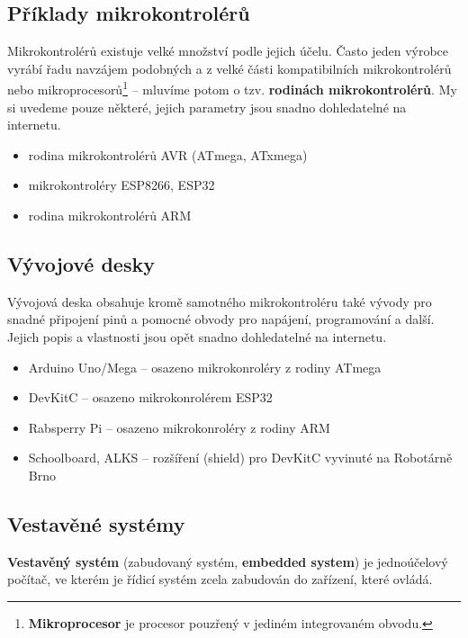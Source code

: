 \documentclass[12pt]{article}
\begin{document}
\subsection{Příklady mikrokontrolérů}

Mikrokontrolérů existuje velké množství podle jejich účelu. 
Často jeden vý\-rob\-ce vyrábí řadu navzájem podobných a z velké části kompatibilních mikrokontrolérů nebo  
mikroprocesorů\footnote{\textbf{Mikroprocesor} je procesor pouzřený v jediném integrovaném obvodu.} -- mluvíme potom o tzv. \textbf{rodinách mikrokontrolérů}.    
My si uvedeme pouze některé, jejich parametry jsou snadno dohledatelné na internetu. 

\begin{itemize}
	\item rodina mikrokontrolérů AVR (ATmega, ATxmega)
	\item  mikrokontroléry ESP8266, ESP32 
	\item rodina  mikrokontrolérů  ARM
\end{itemize}





\subsection{Vývojové desky}

Vývojová deska obsahuje kromě samotného mikrokontroléru také vývody pro snadné připojení pinů a pomocné obvody pro napájení, programování a další. Jejich popis a vlastnosti jsou opět snadno dohledatelné na internetu. 

\begin{itemize}
	\item Arduino Uno/Mega -- osazeno mikrokonroléry z rodiny ATmega
	\item DevKitC  -- osazeno mikrokonrolérem ESP32
	\item Rabsperry Pi  -- osazeno mikrokonroléry z rodiny ARM
	\item Schoolboard, ALKS  -- rozšíření (shield)  pro DevKitC vyvinuté na Robotárně Brno 
\end{itemize}



\subsection{Vestavěné systémy} \label{embedded}
\textbf{Vestavěný systém} (zabudovaný systém, \textbf{embedded system}) je jedno\-ú\-če\-lo\-vý počítač,
ve kterém je řídicí systém zcela zabudován do zařízení, které ovládá. 
\end{document}
